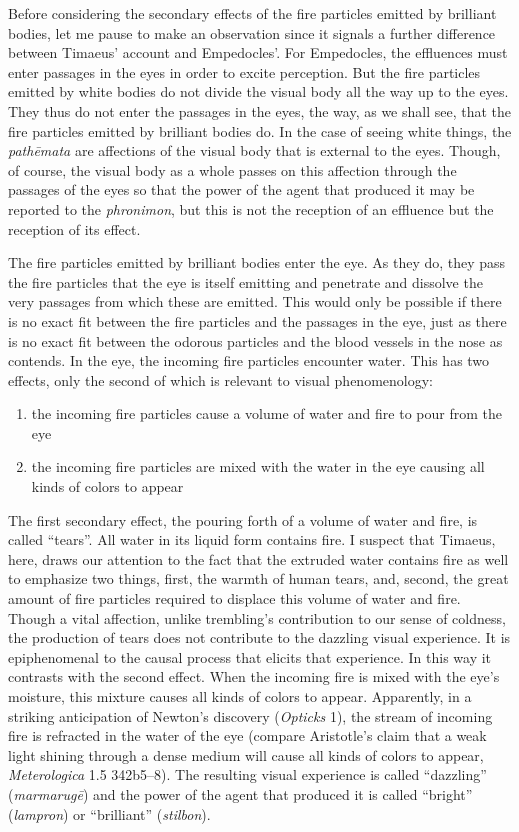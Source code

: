 Before considering the secondary effects of the fire particles emitted by brilliant bodies, let me pause to make an observation since it signals a further difference between Timaeus' account and Empedocles'. For Empedocles, the effluences must enter passages in the eyes in order to excite perception. But the fire particles emitted by white bodies do not divide the visual body all the way up to the eyes. They thus do not enter the passages in the eyes, the way, as we shall see, that the fire particles emitted by brilliant bodies do. In the case of seeing white things, the \emph{pathēmata} are affections of the visual body that is external to the eyes. Though, of course, the visual body as a whole passes on this affection through the passages of the eyes so that the power of the agent that produced it may be reported to the \emph{phronimon}, but this is not the reception of an effluence but the reception of its effect. 

The fire particles emitted by brilliant bodies enter the eye. As they do, they pass the fire particles that the eye is itself emitting and penetrate and dissolve the very passages from which these are emitted. This would only be possible if there is no exact fit between the fire particles and the passages in the eye, just as there is no exact fit between the odorous particles and the blood vessels in the nose as \citet{Vlastos:1967jw} contends. In the eye, the incoming fire particles encounter water. This has two effects, only the second of which is relevant to visual phenomenology:
\begin{enumerate}
	\item the incoming fire particles cause a volume of water and fire to pour from the eye
	\item the incoming fire particles are mixed with the water in the eye causing all kinds of colors to appear
\end{enumerate}
The first secondary effect, the pouring forth of a volume of water and fire, is called ``tears''. All water in its liquid form contains fire. I suspect that Timaeus, here, draws our attention to the fact that the extruded water contains fire as well to emphasize two things, first, the warmth of human tears, and, second, the great amount of fire particles required to displace this volume of water and fire. Though a vital affection, unlike trembling's contribution to our sense of coldness, the production of tears does not contribute to the dazzling visual experience. It is epiphenomenal to the causal process that elicits that experience. In this way it contrasts with the second effect. When the incoming fire is mixed with the eye's moisture, this mixture causes all kinds of colors to appear. Apparently, in a striking anticipation of Newton's discovery (\emph{Opticks} 1), the stream of incoming fire is refracted in the water of the eye (compare Aristotle's claim that a weak light shining through a dense medium will cause all kinds of colors to appear, \emph{Meterologica} 1.5 342b5--8). The resulting visual experience is called ``dazzling'' (\emph{marmarugē}) and the power of the agent that produced it is called ``bright''  (\emph{lampron}) or ``brilliant'' (\emph{stilbon}).

